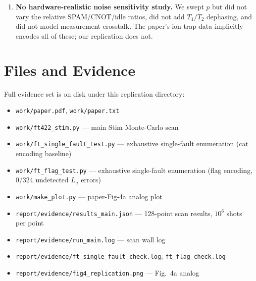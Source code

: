 \documentclass[11pt]{article}
\begin{document}
\begin{enumerate}
\item \textbf{No hardware-realistic noise sensitivity study.} We swept
$p$ but did not vary the relative SPAM/CNOT/idle ratios, did not add
$T_1/T_2$ dephasing, and did not model measurement crosstalk. The
paper's ion-trap data implicitly encodes all of these; our replication
does not.
\end{enumerate}



\section{Files and Evidence}

Full evidence set is on disk under this replication directory:
\begin{itemize}
\item \texttt{work/paper.pdf}, \texttt{work/paper.txt}
\item \texttt{work/ft422\_stim.py} --- main Stim Monte-Carlo scan
\item \texttt{work/ft\_single\_fault\_test.py} --- exhaustive single-fault enumeration (cat encoding baseline)
\item \texttt{work/ft\_flag\_test.py} --- exhaustive single-fault enumeration (flag encoding, 0/324 undetected $L_a$ errors)
\item \texttt{work/make\_plot.py} --- paper-Fig-4a analog plot
\item \texttt{report/evidence/results\_main.json} --- 128-point scan results, $10^6$ shots per point
\item \texttt{report/evidence/run\_main.log} --- scan wall log
\item \texttt{report/evidence/ft\_single\_fault\_check.log}, \texttt{ft\_flag\_check.log}
\item \texttt{report/evidence/fig4\_replication.png} --- Fig.~4a analog
\end{itemize}
\end{document}
